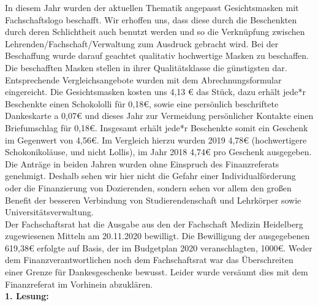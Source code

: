 {    In diesem Jahr wurden der aktuellen Thematik angepasst Gesichtsmasken mit Fachschaftslogo beschafft. Wir erhoffen uns, dass diese durch die Beschenkten durch deren Schlichtheit auch benutzt werden und so die Verknüpfung zwischen Lehrenden/Fachschaft/Verwaltung zum Ausdruck gebracht wird. Bei der Beschaffung wurde darauf geachtet qualitativ hochwertige Masken zu beschaffen. Die beschafften Masken stellen in ihrer Qualitätsklasse die günstigsten dar. Entsprechende Vergleichsangebote wurden mit dem Abrechnungsformular eingereicht. Die Gesichtsmasken kosten uns 4,13 € das Stück, dazu erhält jede*r Beschenkte einen Schokololli für 0,18€, sowie eine persönlich beschriftete Dankeskarte a 0,07€ und dieses Jahr zur Vermeidung persönlicher Kontakte einen Briefumschlag für 0,18€. Insgesamt erhält jede*r Beschenkte somit ein Geschenk im Gegenwert von 4,56€. Im Vergleich hierzu wurden 2019 4,78€ (hochwertigere Schokonikoläuse, und nicht Lollis), im Jahr 2018 4,74€ pro Geschenk ausgegeben. Die Anträge in beiden Jahren wurden ohne Einspruch des Finanzreferats genehmigt. Deshalb sehen wir hier nicht die Gefahr einer Individualförderung oder die Finanzierung von Dozierenden, sondern sehen vor allem den großen Benefit der besseren Verbindung von Studierendenschaft und Lehrkörper sowie Universitätsverwaltung.\\
    Der Fachschaftsrat hat die Ausgabe aus den der Fachschaft Medizin Heidelberg zugewiesenen Mitteln am 20.11.2020 bewilligt. Die Bewilligung der ausgegebenen 619,38€ erfolgte auf Basis, der im Budgetplan 2020 veranschlagten, 1000€. Weder dem Finanzverantwortlichen noch dem Fachschaftsrat war das Überschreiten einer Grenze für Dankesgeschenke bewusst. Leider wurde versäumt dies mit dem Finanzreferat im Vorhinein abzuklären.\\
}{
    \textbf{1. Lesung:}
    \ul{
}
}{
}

